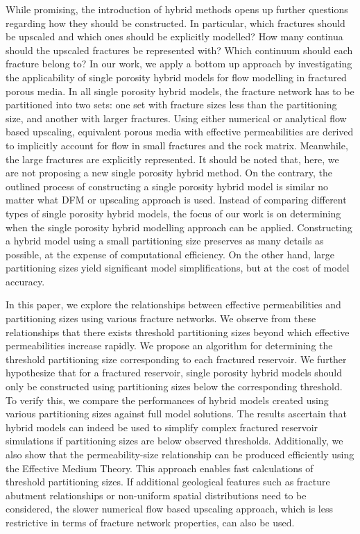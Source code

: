 \documentclass[draft]{agujournal2018}
\begin{document}
While promising, the introduction of hybrid methods opens up further questions regarding how they should be constructed. In particular, which fractures should be upscaled and which ones should be explicitly modelled? How many continua should the upscaled fractures be represented with? Which continuum should each fracture belong to? In our work, we apply a bottom up approach by investigating the applicability of single porosity hybrid models for flow modelling in fractured porous media. In all single porosity hybrid models, the fracture network has to be partitioned into two sets: one set with fracture sizes less than the partitioning size, and another with larger fractures. Using either numerical or analytical flow based upscaling, equivalent porous media with effective permeabilities are derived to implicitly account for flow in small fractures and the rock matrix. Meanwhile, the large fractures are explicitly represented. It should be noted that, here, we are not proposing a new single porosity hybrid method. On the contrary, the outlined process of constructing a single porosity hybrid model is similar no matter what DFM or upscaling approach is used. Instead of comparing different types of single porosity hybrid models, the focus of our work is on determining when the single porosity hybrid modelling approach can be applied. Constructing a hybrid model using a small partitioning size preserves as many details as possible, at the expense of computational efficiency. On the other hand, large partitioning sizes yield significant model simplifications, but at the cost of model accuracy.

In this paper, we explore the relationships between effective permeabilities and partitioning sizes using various fracture networks. We observe from these relationships that there exists threshold partitioning sizes beyond which effective permeabilities increase rapidly. We propose an algorithm for determining the threshold partitioning size corresponding to each fractured reservoir. We further hypothesize that for a fractured reservoir, single porosity hybrid models should only be constructed using partitioning sizes below the corresponding threshold. To verify this, we compare the performances of hybrid models created using various partitioning sizes against full model solutions. The results ascertain that hybrid models can indeed be used to simplify complex fractured reservoir simulations if partitioning sizes are below observed thresholds. Additionally, we also show that the permeability-size relationship can be produced efficiently using the Effective Medium Theory. This approach enables fast calculations of threshold partitioning sizes. If additional geological features such as fracture abutment relationships or non-uniform spatial distributions need to be considered, the slower numerical flow based upscaling approach, which is less restrictive in terms of fracture network properties, can also be used.
\end{document}
